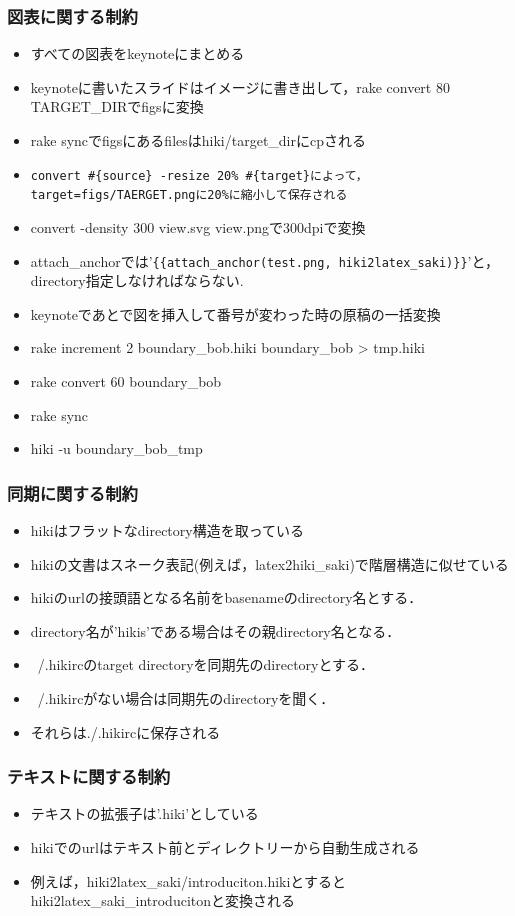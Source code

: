 \subsubsection{図表に関する制約}
\begin{itemize}
\item すべての図表をkeynoteにまとめる
\item keynoteに書いたスライドはイメージに書き出して，rake convert 80 TARGET\_DIRでfigsに変換
\item rake syncでfigsにあるfilesはhiki/target\_dirにcpされる
\item \verb|convert #{source} -resize 20% #{target}によって，target=figs/TAERGET.pngに20%に縮小して保存される|
\item convert -density 300 view.svg view.pngで300dpiで変換
\item attach\_anchorでは'\verb|{{attach_anchor(test.png, hiki2latex_saki)}}|'と，directory指定しなければならない.
\item keynoteであとで図を挿入して番号が変わった時の原稿の一括変換
\item rake increment 2 boundary\_bob.hiki boundary\_bob > tmp.hiki
\item rake convert 60 boundary\_bob
\item rake sync
\item hiki -u boundary\_bob\_tmp
\end{itemize}
\subsubsection{同期に関する制約}
\begin{itemize}
\item hikiはフラットなdirectory構造を取っている
\item hikiの文書はスネーク表記(例えば，latex2hiki\_saki)で階層構造に似せている
\item hikiのurlの接頭語となる名前をbasenameのdirectory名とする．
\item directory名が'hikis'である場合はその親directory名となる．
\item ~/.hikircのtarget directoryを同期先のdirectoryとする．
\item ~/.hikircがない場合は同期先のdirectoryを聞く．
\item それらは./.hikircに保存される
\end{itemize}
\subsubsection{テキストに関する制約}
\begin{itemize}
\item テキストの拡張子は'.hiki'としている
\item hikiでのurlはテキスト前とディレクトリーから自動生成される
\item 例えば，hiki2latex\_saki/introduciton.hikiとするとhiki2latex\_saki\_introducitonと変換される
\end{itemize}

